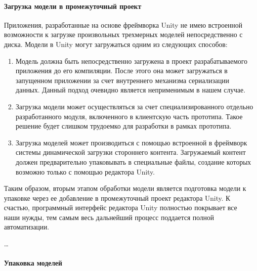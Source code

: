 \paragraph{Загрузка модели в промежуточный проект}

Приложения, разработанные на основе фреймворка Unity не имею встроенной возможности
к загрузке произвольных трехмерных моделей непосредственно с диска.
Модели в Unity могут загружаться одним из следующих способов:

\begin{enumerate}
    \item {
        Модель должна быть непосредственно загружена в проект
        разрабатываемого приложения до его компиляции.
        После этого она может загружаться в запущенном приложении
        за счет внутреннего механизма сериализации данных.
        Данный подход очевидно является неприменимым в нашем случае.
    }
    \item {
        Загрузка модели может осуществляться за счет
        специализированного отдельно разработанного модуля,
        включенного в клиентскую часть прототипа.
        Такое решение будет слишком трудоемко для разработки в рамках прототипа. 
    }
    \item {
        Загрузка моделей может производиться с помощью встроенной в фреймворк
        системы динамической загрузки стороннего контента.
        Загружаемый контент должен предварительно упаковывать
        в специальные файлы, создание которых возможно только
        с помощью редактора Unity.
    }
\end{enumerate}

Таким образом, вторым этапом обработки модели является подготовка модели к упаковке
через ее добавление в промежуточный проект редактора Unity.
К счастью, программный интерфейс редактора Unity полностью покрывает
все наши нужды, тем самым весь дальнейший процесс поддается полной автоматизации.

\dots

\paragraph{Упаковка моделей}


